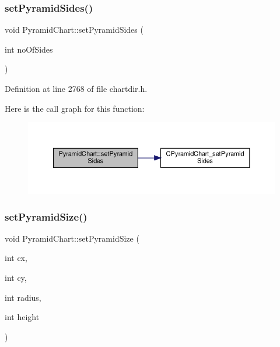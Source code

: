 \subsubsection{\texorpdfstring{set\+Pyramid\+Sides()}{setPyramidSides()}}
{\footnotesize\ttfamily void Pyramid\+Chart\+::set\+Pyramid\+Sides (\begin{DoxyParamCaption}\item[{int}]{no\+Of\+Sides }\end{DoxyParamCaption})\hspace{0.3cm}{\ttfamily [inline]}}



Definition at line 2768 of file chartdir.\+h.

Here is the call graph for this function\+:
\nopagebreak
\begin{figure}[H]
\begin{center}
\leavevmode
\includegraphics[width=350pt]{class_pyramid_chart_af7e6a941c23f36996ee7e5aea4d3ba9b_cgraph}
\end{center}
\end{figure}
\mbox{\label{class_pyramid_chart_ad2e427bdcbcf4a555c9e5143c12f36b1}} 
\subsubsection{\texorpdfstring{set\+Pyramid\+Size()}{setPyramidSize()}}
{\footnotesize\ttfamily void Pyramid\+Chart\+::set\+Pyramid\+Size (\begin{DoxyParamCaption}\item[{int}]{cx,  }\item[{int}]{cy,  }\item[{int}]{radius,  }\item[{int}]{height }\end{DoxyParamCaption})\hspace{0.3cm}{\ttfamily [inline]}}



